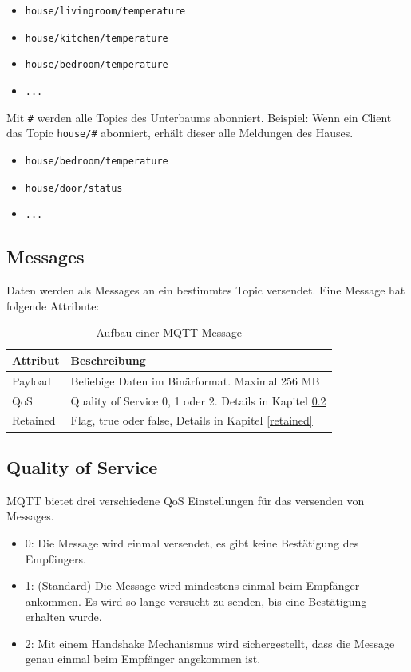 \begin{itemize}
	\item \texttt{house/livingroom/temperature}
    \item \texttt{house/kitchen/temperature}
    \item \texttt{house/bedroom/temperature}
    \item \texttt{...}
\end{itemize}

Mit \texttt{\#} werden alle Topics des Unterbaums abonniert.
Beispiel: Wenn ein Client das Topic \texttt{house/\#} abonniert, erhält dieser alle Meldungen des Hauses.

\begin{itemize}
	\item \texttt{house/bedroom/temperature}
    \item \texttt{house/door/status}
    \item \texttt{...}
\end{itemize}

\subsection{Messages}
Daten werden als Messages an ein bestimmtes Topic versendet. Eine Message hat folgende Attribute:

\begin{table}[H]
\centering
\begin{tabular}{|l|l|}
	\hline \rowcolor{lightgray}
	\textbf{Attribut} & \textbf{Beschreibung} \\ \hline
	Payload   & Beliebige Daten im Binärformat. Maximal 256 MB     \\ \hline
	QoS       & Quality of Service 0, 1 oder 2. Details in Kapitel \ref{qos}    \\ \hline
	Retained  & Flag, true oder false, Details in Kapitel \ref{retained}     \\  	\hline
\end{tabular}
\caption{Aufbau einer MQTT Message}
\end{table}


\subsection{Quality of Service} \label{qos}
MQTT bietet drei verschiedene QoS Einstellungen für das versenden von Messages.
\begin{itemize}
\item 0: Die Message wird einmal versendet, es gibt keine Bestätigung des Empfängers.
\item 1: (Standard) Die Message wird mindestens einmal beim Empfänger ankommen. Es wird so lange versucht zu senden, bis eine Bestätigung erhalten wurde.
\item 2: Mit einem Handshake Mechanismus wird sichergestellt, dass die Message genau einmal beim Empfänger angekommen ist.
\end{itemize}

